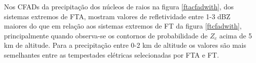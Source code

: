 








Nos CFADs da precipitação dos núcleos de raios na figura \ref{ftacfadwith}, dos sistemas extremos de FTA, mostram valores de refletividade entre 1-3 dBZ maiores do que em relação aos sistemas extremos de FT da figura \ref{ftcfadwith}, principalmente quando observa-se os contornos de probabilidade de $Z_c$ acima de 5 km de altitude. Para a precipitação entre 0-2 km de altitude os valores são mais semelhantes entre as tempestades elétricas selecionadas por FTA e FT. 

